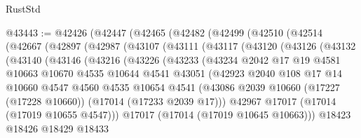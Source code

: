 \begin{lexlean}{RustStd}
\begin{coremodule}
{\begin{coremodule}
{{{{{{{{{{{{{{{{{{{{{{{{{{{{{{{{{{{{{{{{{{{{{{{{{{{{{{{@43443 := @42426
    (@42447
      (@42465
        (@42482
          (@42499
            (@42510
              (@42514
                (@42667
                  (@42897
                    (@42987
                      (@43107
                        (@43111
                          (@43117
                            (@43120
                              (@43126
                                (@43132
                                  (@43140
                                    (@43146
                                      (@43216
                                        (@43226
                                          (@43233
                                            (@43234
                                              @2042
                                              @17
                                              @19
                                              @4581
                                              @10663
                                              @10670
                                              @4535
                                              @10644
                                              @4541
                                              @43051
                                              (@42923
                                                @2040
                                                @108
                                                @17
                                                @14
                                                @10660
                                                @4547
                                                @4560
                                                @4535
                                                @10654
                                                @4541
                                                (@43086
                                                  @2039
                                                  @10660
                                                  (@17227 (@17228 @10660))
                                                  (@17014 (@17233 @2039 @17)))
                                                @42967
                                                @17017
                                                (@17014 (@17019 @10655 @4547)))
                                              @17017
                                              (@17014 (@17019 @10645 @10663)))
                                            @18423
                                            @18426
                                            @18429
                                            @18433
}}}}}}}}}}}}}}}}}}}}}}}}}}}}}}}}}}}}}}}}}}}}}}}}}}}}}}}
\end{coremodule}}
\end{coremodule}
\end{lexlean}
